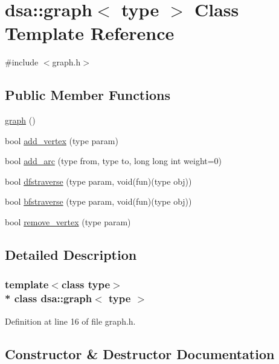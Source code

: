 \hypertarget{classdsa_1_1graph}{}\section{dsa\+:\+:graph$<$ type $>$ Class Template Reference}
\label{classdsa_1_1graph}


{\ttfamily \#include $<$graph.\+h$>$}

\subsection*{Public Member Functions}
\begin{DoxyCompactItemize}
\item 
\hyperlink{classdsa_1_1graph_acd8aaadec7c95535e2ea5bac2448df3b}{graph} ()
\item 
bool \hyperlink{classdsa_1_1graph_abca01103a01cd13e5a37a11aad821f91}{add\+\_\+vertex} (type param)
\item 
bool \hyperlink{classdsa_1_1graph_a166f9f58c2dc96421412f3f690b1d5ab}{add\+\_\+arc} (type from, type to, long long int weight=0)
\item 
bool \hyperlink{classdsa_1_1graph_a0c9b4ee260388c64a5a5d4f63f5fbda4}{dfstraverse} (type param, void(fun)(type obj))
\item 
bool \hyperlink{classdsa_1_1graph_a07367f1a723dcd03b8dedef9cd770790}{bfstraverse} (type param, void(fun)(type obj))
\item 
bool \hyperlink{classdsa_1_1graph_a3b227cd8d51e14e5a53e49db299e601b}{remove\+\_\+vertex} (type param)
\end{DoxyCompactItemize}


\subsection{Detailed Description}
\subsubsection*{template$<$class type$>$\\*
class dsa\+::graph$<$ type $>$}



Definition at line 16 of file graph.\+h.



\subsection{Constructor \& Destructor Documentation}
